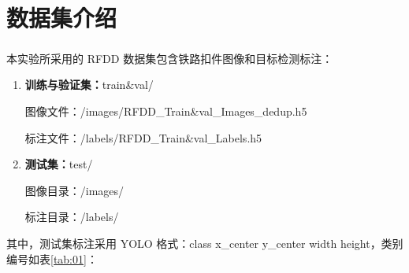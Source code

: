 \documentclass[12pt, oneside, a4paper]{ctexart}
\begin{document}
\section{数据集介绍}
\par{}
本实验所采用的 RFDD 数据集\textsuperscript{\color{red}\cite{ref1}}包含铁路扣件图像和目标检测标注：
\begin{enumerate}[\bf(1)]
    \vspace{-2.4mm}
    \item \textbf{训练与验证集：}{train\&val/}
          \vspace{-1.5mm}
          \par{}
          \hspace{1.65em}
          图像文件：{/images/RFDD\_Train\&val\_Images\_dedup.h5}
          \vspace{-1.5mm}
          \par{}
          \hspace{1.65em}
          标注文件：{/labels/RFDD\_Train\&val\_Labels.h5}
          \vspace{-1.5mm}
          \vspace{-2mm}
    \item \textbf{测试集：}{test/}
          \vspace{-1.5mm}
          \vspace{-1.5mm}
          \par{}
          \hspace{1.65em}
          图像目录：{/images/}
          \vspace{-1.5mm}
          \par{}
          \hspace{1.65em}
          标注目录：{/labels/}
          \vspace{-3.5mm}
\end{enumerate}
\par{}
其中，测试集标注采用 YOLO 格式：{class x\_center y\_center width height}，类别编号如表\ref{tab:01}：
\end{document}
